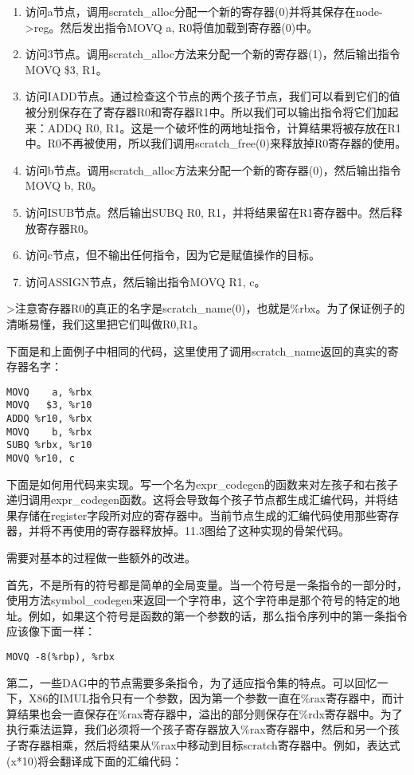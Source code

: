 \documentclass[cn,11pt,chinese]{elegantbook}
\begin{document}
\begin{enumerate}
  \item 访问a节点，调用scratch\_alloc分配一个新的寄存器(0)并将其保存在node->reg。然后发出指令MOVQ a, R0将值加载到寄存器(0)中。
  \item 访问3节点。调用scratch\_alloc方法来分配一个新的寄存器(1)，然后输出指令MOVQ \$3, R1。
  \item 访问IADD节点。通过检查这个节点的两个孩子节点，我们可以看到它们的值被分别保存在了寄存器R0和寄存器R1中。所以我们可以输出指令将它们加起来：ADDQ R0, R1。这是一个破坏性的两地址指令，计算结果将被存放在R1中。R0不再被使用，所以我们调用scratch\_free(0)来释放掉R0寄存器的使用。
  \item 访问b节点。调用scratch\_alloc方法来分配一个新的寄存器(0)，然后输出指令MOVQ b, R0。
  \item 访问ISUB节点。然后输出SUBQ R0, R1，并将结果留在R1寄存器中。然后释放寄存器R0。
  \item 访问c节点，但不输出任何指令，因为它是赋值操作的目标。
  \item 访问ASSIGN节点，然后输出指令MOVQ R1, c。
\end{enumerate}

>注意寄存器R0的真正的名字是scratch\_name(0)，也就是\%rbx。为了保证例子的清晰易懂，我们这里把它们叫做R0,R1。

下面是和上面例子中相同的代码，这里使用了调用scratch\_name返回的真实的寄存器名字：

\begin{verbatim}
MOVQ    a, %rbx
MOVQ   $3, %r10
ADDQ %r10, %rbx
MOVQ    b, %rbx
SUBQ %rbx, %r10
MOVQ %r10, c
\end{verbatim}

下面是如何用代码来实现。写一个名为expr\_codegen的函数来对左孩子和右孩子递归调用expr\_codegen函数。这将会导致每个孩子节点都生成汇编代码，并将结果存储在register字段所对应的寄存器中。当前节点生成的汇编代码使用那些寄存器，并将不再使用的寄存器释放掉。11.3图给了这种实现的骨架代码。

需要对基本的过程做一些额外的改进。

首先，不是所有的符号都是简单的全局变量。当一个符号是一条指令的一部分时，使用方法symbol\_codegen来返回一个字符串，这个字符串是那个符号的特定的地址。例如，如果这个符号是函数的第一个参数的话，那么指令序列中的第一条指令应该像下面一样：

\begin{verbatim}
MOVQ -8(%rbp), %rbx
\end{verbatim}

第二，一些DAG中的节点需要多条指令，为了适应指令集的特点。可以回忆一下，X86的IMUL指令只有一个参数，因为第一个参数一直在\%rax寄存器中，而计算结果也会一直保存在\%rax寄存器中，溢出的部分则保存在\%rdx寄存器中。为了执行乘法运算，我们必须将一个孩子寄存器放入\%rax寄存器中，然后和另一个孩子寄存器相乘，然后将结果从\%rax中移动到目标scratch寄存器中。例如，表达式(x*10)将会翻译成下面的汇编代码：
\end{document}
